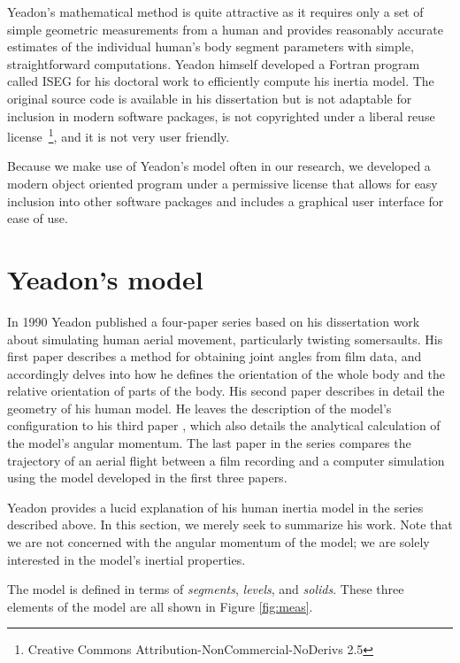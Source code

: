 \documentclass[10pt]{article}
\begin{document}
Yeadon's mathematical method is quite attractive as it requires only a set of
simple geometric measurements from a human and provides reasonably accurate
estimates of the individual human's body segment parameters with simple,
straightforward computations. Yeadon himself developed a Fortran program called
ISEG for his doctoral work \cite{Yeadon1984a} to efficiently compute his
inertia model. The original source code is available in his dissertation but is
not adaptable for inclusion in modern software packages, is not
copyrighted under a liberal reuse license~\footnote{Creative Commons
Attribution-NonCommercial-NoDerivs 2.5}, and it is not very user friendly.

Because we make use of Yeadon's model often in our research, we developed a
modern object oriented program under a permissive license that allows for easy
inclusion into other software packages and includes a graphical user interface
for ease of use.

\section*{Yeadon's model}

In 1990 Yeadon published a four-paper series based on his dissertation work
about simulating human aerial movement, particularly twisting somersaults. His
first paper \cite{Yeadon1990c} describes a method for obtaining joint angles
from film data, and accordingly delves into how he defines the orientation of
the whole body and the relative orientation of parts of the body. His second
paper \cite{Yeadon1990f} describes in detail the geometry of his human model.
He leaves the description of the model's configuration to his third paper
\cite{Yeadon1990e}, which also details the analytical calculation of the
model's angular momentum. The last paper in the series \cite{Yeadon1990d}
compares the trajectory of an aerial flight between a film recording and a
computer simulation using the model developed in the first three papers.

Yeadon provides a lucid explanation of his human inertia model in the series
described above. In this section, we merely seek to summarize his work. Note
that we are not concerned with the angular momentum of the model; we are solely
interested in the model's inertial properties.

The model is defined in terms of \emph{segments}, \emph{levels}, and
\emph{solids}. These three elements of the model are all shown in Figure
\ref{fig:meas}.
\end{document}
